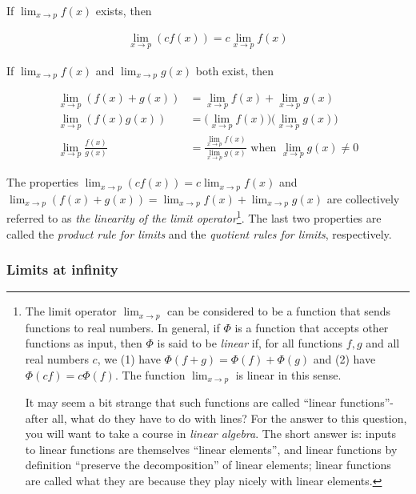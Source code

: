 If $\lim_{x \rightarrow p} f(x)$ exists, then

\begin{align*}
    \lim_{x \rightarrow p} (c f(x)) = c \lim_{x \rightarrow p} f(x)
\end{align*}

If $\lim_{x \rightarrow p} f(x)$ and $\lim_{x \rightarrow p} g(x)$ both exist, then

\begin{align*}
    \lim_{x \rightarrow p} (f(x) + g(x)) &= \lim_{x \rightarrow p} f(x) + \lim_{x \rightarrow p} g(x) \\
    \lim_{x \rightarrow p} (f(x) g(x)) &= \Big( \lim_{x \rightarrow p} f(x) \Big) \Big( \lim_{x \rightarrow p} g(x) \Big) \\
    \lim_{x \rightarrow p} \frac{f(x)}{g(x)} &= \frac{\lim_{x \rightarrow p} f(x)}{\lim_{x \rightarrow p} g(x)} \text{ when } \lim_{x \rightarrow p} g(x) \neq 0
\end{align*}

The properties $\lim_{x \rightarrow p} (c f(x)) = c \lim_{x \rightarrow p} f(x)$ and $\lim_{x \rightarrow p} (f(x) + g(x)) = \lim_{x \rightarrow p} f(x) + \lim_{x \rightarrow p} g(x)$ are collectively referred to as \textit{the linearity of the limit operator}\footnote{The limit operator $\lim_{x \rightarrow p}$ can be considered to be a function that sends functions to real numbers. In general, if $\Phi$ is a function that accepts other functions as input, then $\Phi$ is said to be \textit{linear} if, for all functions $f, g$ and all real numbers $c$, we (1) have $\Phi(f + g) = \Phi(f) + \Phi(g)$ and (2) have $\Phi(cf) = c\Phi(f)$. The function $\lim_{x \rightarrow p}$ is linear in this sense.

It may seem a bit strange that such functions are called ``linear functions''- after all, what do they have to do with lines? For the answer to this question, you will want to take a course in \textit{linear algebra}. The short answer is: inputs to linear functions are themselves ``linear elements'', and linear functions by definition ``preserve the decomposition'' of linear elements; linear functions are called what they are because they play nicely with linear elements.}. The last two properties are called the \textit{product rule for limits} and the \textit{quotient rules for limits}, respectively.
    
\subsubsection*{Limits at infinity}

